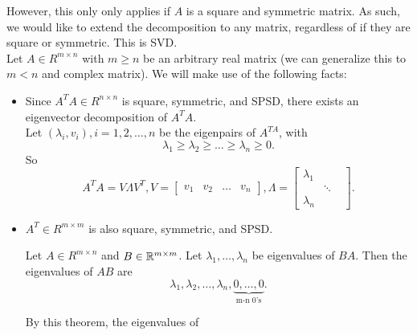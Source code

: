 \documentclass[../main/main.tex]{subfiles}
\begin{document}
However, this only only applies if $A$ is a square and symmetric matrix. As such, we would like to extend the decomposition to any matrix, regardless of if they are square or symmetric. This is SVD. \\

Let $A\in R^{m\times n}$ with $m\ge n$ be an arbitrary real matrix (we can generalize this to $m<n$ and complex matrix). We will make use of the following facts:
\begin{itemize}
	\item Since $A^{T}A\in R^{n\times n}$ is square, symmetric, and SPSD, there exists an eigenvector decomposition of $A^{T}A$. \\

Let $(\lambda_i,v_i),i=1,2,\ldots, n$ be the eigenpairs of $A^{TA}$, with \[
\lambda_1\ge \lambda_2\ge \ldots\ge \lambda_n\ge 0
.\] So \[
A^{T}A=V\Lambda V^{T}, V=\begin{bmatrix} v_1&v_2&\ldots&v_n \end{bmatrix}, \Lambda=\begin{bmatrix} \lambda_1&&\\&\ddots&\\\lambda_n \end{bmatrix} 
.\] 
\item $A^{T}\in R^{m\times m}$ is also square, symmetric, and SPSD. 
	\begin{theorem}
		Let $A\in R^{m\times n}$ and $B\in \mathbb{R}^{m\times m}$. Let $\lambda_1,\ldots,\lambda_n$ be eigenvalues of $BA$. Then the eigenvalues of $AB$ are  \[
			\lambda_1, \lambda_2, \ldots,\lambda_n,\underbrace{0,\ldots,0}_\text{m-n 0's}
		.\] 
	\end{theorem}
	By this theorem, the eigenvalues of
\end{itemize}
\end{document}

